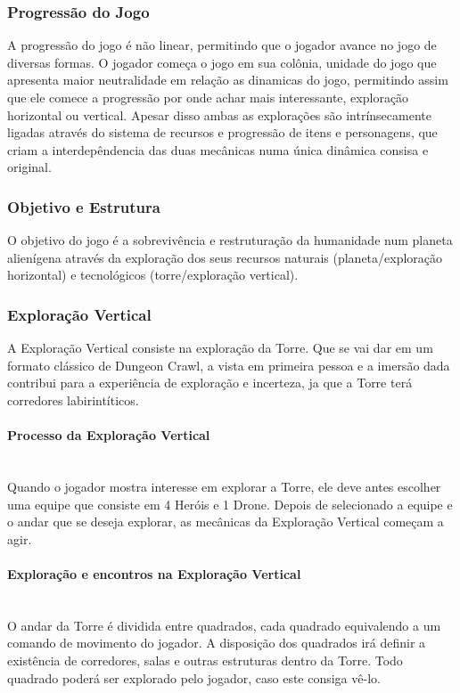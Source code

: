 \documentclass[11pt]{article} %
\begin{document}
\subsubsection{Progressão do Jogo}
A progressão do jogo é não linear, permitindo que o jogador avance no jogo de diversas formas. O jogador começa o jogo em sua colônia, unidade do jogo que apresenta maior neutralidade em relação as dinamicas do jogo, permitindo assim que ele comece a progressão por onde achar mais interessante, exploração horizontal ou vertical. Apesar disso ambas as explorações são intrínsecamente ligadas através do sistema de recursos e progressão de itens e personagens, que criam a interdepêndencia das duas mecânicas numa única dinâmica consisa e original. 

\subsubsection{Objetivo e Estrutura}
O objetivo do jogo é a sobrevivência e restruturação da humanidade num planeta alienígena através da exploração dos seus recursos naturais (planeta/exploração horizontal) e tecnológicos (torre/exploração vertical).

\subsubsection{Exploração Vertical}
A Exploração Vertical consiste na exploração da Torre. Que se vai dar em um formato clássico de Dungeon Crawl, a vista em primeira pessoa e a imersão dada contribui para a experiência de exploração e incerteza, ja que a Torre terá corredores labirintíticos.

\paragraph{Processo da Exploração Vertical} \mbox{}\\
Quando o jogador mostra interesse em explorar a Torre, ele deve antes escolher uma equipe que consiste em 4 Heróis e 1 Drone. Depois de selecionado a equipe e o andar que se deseja explorar, as mecânicas da Exploração Vertical começam a agir.

\paragraph{Exploração e encontros na Exploração Vertical} \mbox{}\\
O andar da Torre é dividida entre quadrados, cada quadrado equivalendo a um comando de movimento do jogador. A disposição dos quadrados irá definir a existência de corredores, salas e outras estruturas dentro da Torre. Todo quadrado poderá ser explorado pelo jogador, caso este consiga vê-lo.
\end{document}
